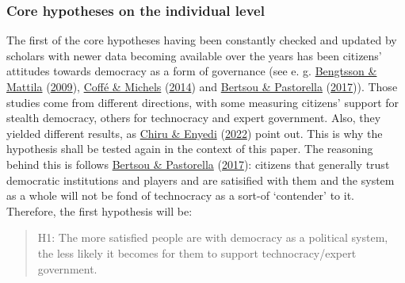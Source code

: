 \documentclass[
  12pt,
  english,
]{article}
\begin{document}
\hypertarget{core-hypotheses-on-the-individual-level}{%
\subsubsection{Core hypotheses on the individual
level}\label{core-hypotheses-on-the-individual-level}}

The first of the core hypotheses having been constantly checked and
updated by scholars with newer data becoming available over the years
has been citizens' attitudes towards democracy as a form of governance
(see e. g. \protect\hyperlink{ref-bengtsson2009direct}{Bengtsson \&
Mattila} (\protect\hyperlink{ref-bengtsson2009direct}{2009}),
\protect\hyperlink{ref-coffe2014education}{Coffé \& Michels}
(\protect\hyperlink{ref-coffe2014education}{2014}) and
\protect\hyperlink{ref-bertsou2017technocratic}{Bertsou \& Pastorella}
(\protect\hyperlink{ref-bertsou2017technocratic}{2017})). Those studies
come from different directions, with some measuring citizens' support
for stealth democracy, others for technocracy and expert government.
Also, they yielded different results, as
\protect\hyperlink{ref-chiru2022wants}{Chiru \& Enyedi}
(\protect\hyperlink{ref-chiru2022wants}{2022}) point out. This is why
the hypothesis shall be tested again in the context of this paper. The
reasoning behind this is follows
\protect\hyperlink{ref-bertsou2017technocratic}{Bertsou \& Pastorella}
(\protect\hyperlink{ref-bertsou2017technocratic}{2017}): citizens that
generally trust democratic institutions and players and are satisified
with them and the system as a whole will not be fond of technocracy as a
sort-of `contender' to it. Therefore, the first hypothesis will be:

\begin{quote}
H1: The more satisfied people are with democracy as a political system,
the less likely it becomes for them to support technocracy/expert
government.
\end{quote}
\end{document}
